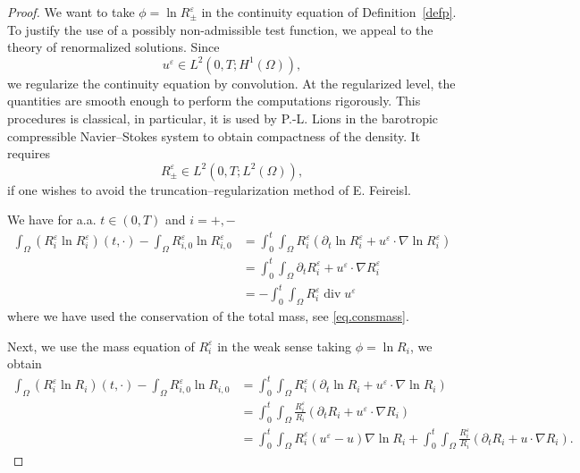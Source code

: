 \documentclass[11pt, twoside, a4paper]{article}
\theoremstyle{plain}
\theoremstyle{remark}
\numberwithin{equation}{section}
\renewcommand{\div}{\operatorname{div}}
\newcommand{\dt}{\partial_t}
\newcommand{\eps}{\varepsilon}
\begin{document}
\begin{proof}
We want to take $\phi = \ln R_\pm^\eps$ in the continuity equation of Definition~\ref{defp}. To justify the use of a possibly non-admissible test function, we appeal to the theory of renormalized solutions. Since 
\[
u^\varepsilon \in L^2(0,T; H^1(\Omega)),
\]
we regularize the continuity equation by convolution.
At the regularized level, the quantities are smooth enough to perform the computations rigorously. This procedures is classical, in particular, it is used by P.-L. Lions in the barotropic compressible Navier--Stokes system to obtain compactness of the density. It requires
\[
R^\eps_\pm \in L^2(0,T; L^2(\Omega)),
\]
if one wishes to avoid the truncation--regularization method of E. Feireisl.

We have for a.a. $t\in (0,T)$ and $i=+,-$
\begin{align*}
 \int_\Omega (R_i^\eps \ln R_i^\eps)(t,\cdot) -\int_\Omega R_{i,0}^\eps \ln R_{i,0}^\eps &= \int_0^t\!\!\! \int_\Omega R_i^\eps (\dt \ln R_i^\eps + u^\eps \cdot \nabla \ln R_i^\eps)\\
 &= \int_0^t\!\!\! \int_\Omega \dt R_i^\eps + u^\eps \cdot \nabla R_i^\eps \\
 &= - \int_0^t\!\!\! \int_\Omega R_i^\eps \div u^\eps 
\end{align*}
where we have used the conservation of the total mass, see \eqref{eq.consmass}. 


Next, we use the mass equation of $R_i^\eps$ in the weak sense taking $\phi = \ln R_i$, we obtain
\begin{align*}
 \int_\Omega (R_i^\eps \ln R_i)(t,\cdot) -\int_\Omega R_{i,0}^\eps \ln R_{i,0} 
 &=\int_0^t\!\!\! \int_\Omega R_i^\eps (\dt \ln R_i + u^\eps \cdot \nabla \ln R_i)\\
 &= \int_0^t\!\!\! \int_\Omega \frac{R_i^\eps}{R_i} (\dt R_i + u^\eps \cdot \nabla R_i)\\
 &= \int_0^t\!\!\! \int_\Omega R_i^\eps (u^\eps - u) \nabla \ln R_i + \int_0^t\!\!\! \int_\Omega \frac{R_i^\eps}{R_i} (\dt R_i + u \cdot \nabla R_i).
\end{align*}


\end{proof}
\end{document}
